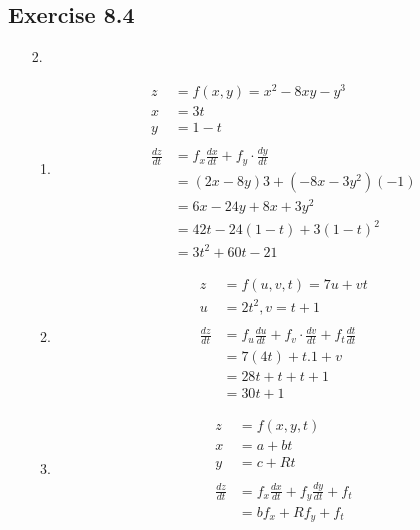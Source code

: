 \documentclass{./../../Latex/homework}
\begin{document}
\subsection*{Exercise 8.4} 

\begin{enumerate}
\item[2.] 
\begin{enumerate}
\item
$$
\begin{aligned}
z &=f(x, y)=x^{2}-8 x y-y^{3} \\
x &=3 t \\
y &=1-t \\~\\
\frac{d z}{d t} &=f_x \frac{d x}{d t}+f_y \cdot \frac{d y}{d t} \\
&=(2 x-8 y) 3+\left(-8 x-3 y^{2}\right)(-1) \\
&=6 x-24 y+8 x+3 y^{2} \\
&=42 t-24(1-t)+3(1-t)^{2} \\
&=3 t^{2}+60 t-21
\end{aligned}
$$

\item
$$
\begin{aligned}
z &=f(u, v, t)=7 u+v t \\
u &=2 t^{2}, v=t+1 \\~\\
\frac{d z}{d t} &=f_u \frac{d u}{d t}+f_v \cdot \frac{d v}{d t}+f_t \frac{d t}{d t} \\
&=7(4 t)+t .1+v \\
&=28 t+t+t+1 \\
&=30 t+1
\end{aligned}
$$

\item
$$
\begin{aligned}
z &=f(x, y, t) \\
x &=a+b t \\
y &=c+R t \\~\\
\frac{d z}{d t} &=f_{x} \frac{d x}{d t}+f_{y} \frac{d y}{d t}+f_{t} \\
&=b f_{x}+R f_{y}+f_{t}
\end{aligned}
$$
\end{enumerate}


\end{enumerate}
\end{document}

